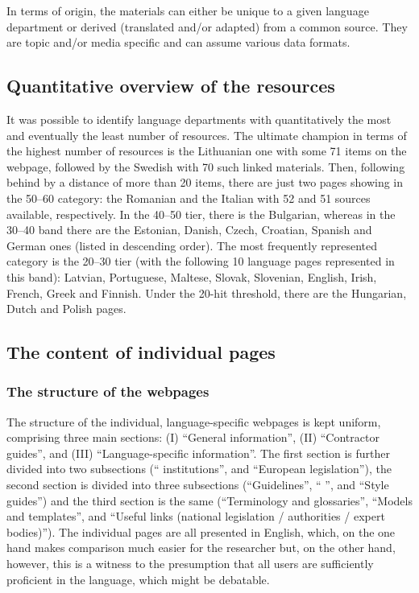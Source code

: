 \documentclass[output=paper]{langsci/langscibook}
\begin{document}
\largerpage
In terms of origin, the materials can either be unique to a given language department or derived (translated and/or adapted) from a common source. They are topic and/or media specific and can assume various data formats. 

\subsection{Quantitative overview of the resources}\label{sec:svoboda:4.2}

It was possible to identify language departments with quantitatively the most and eventually the least number of resources. The ultimate champion in terms of the highest number of resources is the Lithuanian one with some 71 items on the webpage, followed by the Swedish with 70 such linked materials. Then, following behind by a distance of more than 20 items, there are just two pages showing in the 50–60 category: the Romanian and the Italian with 52 and 51 sources available, respectively. In the 40–50 tier, there is the Bulgarian, whereas in the 30–40 band there are the Estonian, Danish, Czech, Croatian, Spanish and German ones (listed in descending order). The most frequently represented category is the 20–30 tier (with the following 10 language pages represented in this band): Latvian, Portuguese, Maltese, Slovak, Slovenian, English, Irish, French, Greek and Finnish. Under the 20-hit threshold, there are the Hungarian, Dutch and Polish pages.

\subsection{The content of individual pages}\label{sec:svoboda:4.3}

\subsubsection{The structure of the webpages}\label{sec:svoboda:4.3.1}

The structure of the individual, language-specific webpages is kept uniform, comprising three main sections: (I) “General  information”, (II) “Contractor guides”, and (III) “Language-specific information”. The first section is further divided into two subsections (“ institutions”, and “European legislation”), the second section is divided into three subsections (“Guidelines”, “ ”, and “Style guides”) and the third section is the same (“Terminology and glossaries”, “Models and templates”, and “Useful links (national legislation / authorities / expert bodies)”). The individual pages are all presented in English, which, on the one hand makes comparison much easier for the researcher but, on the other hand, however, this is a witness to the presumption that all users are sufficiently proficient in the language, which might be debatable.
\end{document}
